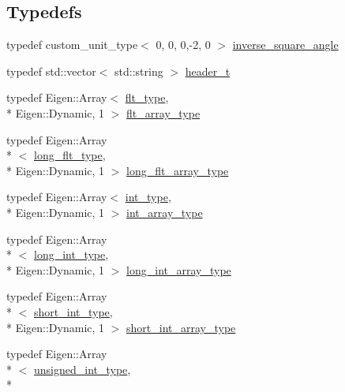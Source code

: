 \subsection*{Typedefs}
\begin{DoxyCompactItemize}
\item 
typedef custom\-\_\-unit\-\_\-type$<$ 0, 0, 0,-\/2, 0 $>$ \hyperlink{namespaceIceBRG_a26efaff9c9adf346c7d09d0b714731f6}{inverse\-\_\-square\-\_\-angle}
\item 
typedef std\-::vector$<$ std\-::string $>$ \hyperlink{namespaceIceBRG_a49e8b48f1dbd351e9748e7cbe80705df}{header\-\_\-t}
\item 
typedef Eigen\-::\-Array$<$ \hyperlink{lib_2IceBRG__main_2common_8h_ad0f130a56eeb944d9ef2692ee881ecc4}{flt\-\_\-type}, \\*
Eigen\-::\-Dynamic, 1 $>$ \hyperlink{namespaceIceBRG_acdca5c05302480eba6ba053449643a6d}{flt\-\_\-array\-\_\-type}
\item 
typedef Eigen\-::\-Array\\*
$<$ \hyperlink{lib_2IceBRG__main_2common_8h_a7040956e7e1b504d34a9ccfb4253bdce}{long\-\_\-flt\-\_\-type}, \\*
Eigen\-::\-Dynamic, 1 $>$ \hyperlink{namespaceIceBRG_a92601c7ccb2563723f800de23ba666a6}{long\-\_\-flt\-\_\-array\-\_\-type}
\item 
typedef Eigen\-::\-Array$<$ \hyperlink{lib_2IceBRG__main_2common_8h_ac4de9d9335536ac22821171deec8d39e}{int\-\_\-type}, \\*
Eigen\-::\-Dynamic, 1 $>$ \hyperlink{namespaceIceBRG_a72d4ae57531ad9188ff53d6b8ff93d32}{int\-\_\-array\-\_\-type}
\item 
typedef Eigen\-::\-Array\\*
$<$ \hyperlink{lib_2IceBRG__main_2common_8h_a155f1d4a7ac7ced2a2aa269b30ba2558}{long\-\_\-int\-\_\-type}, \\*
Eigen\-::\-Dynamic, 1 $>$ \hyperlink{namespaceIceBRG_a17a6514be330cb5afcbb419e6c50e844}{long\-\_\-int\-\_\-array\-\_\-type}
\item 
typedef Eigen\-::\-Array\\*
$<$ \hyperlink{lib_2IceBRG__main_2common_8h_a9a4c2c3afa89b73437fa1d63d607c7c1}{short\-\_\-int\-\_\-type}, \\*
Eigen\-::\-Dynamic, 1 $>$ \hyperlink{namespaceIceBRG_a5dfb15d72d312a490f6e4db9e75f4359}{short\-\_\-int\-\_\-array\-\_\-type}
\item 
typedef Eigen\-::\-Array\\*
$<$ \hyperlink{lib_2IceBRG__main_2common_8h_ad07df5ef3fc84baf3f65e6f4c1b80afc}{unsigned\-\_\-int\-\_\-type}, \\*

\end{DoxyCompactItemize}
